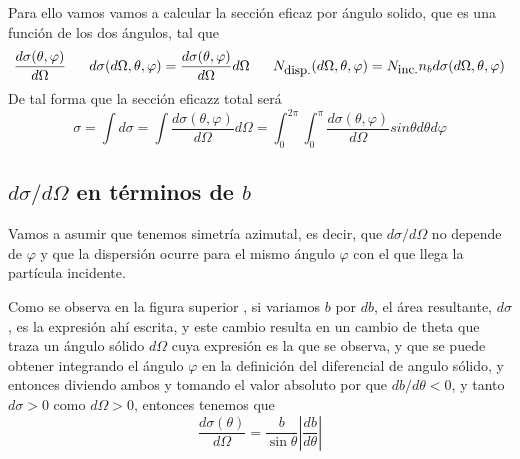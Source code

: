 Para ello vamos vamos a calcular la sección eficaz por ángulo solido, que es una función de los dos ángulos, tal que
\begin{equation} \label{6.1.1}
    \frac{d\sigma(\theta,\varphi)}{d\Omega}\ \ \ \ \ d\sigma(d\Omega, \theta,\varphi) = \frac{d\sigma(\theta,\varphi)}{d\Omega} d\Omega \ \ \ \ \ N_{\mbox{\small disp.}}(d\Omega, \theta,\varphi) = N_{\mbox{\small inc.}} n_b d\sigma(d\Omega, \theta,\varphi)
\end{equation} 
De tal forma que la sección eficazz total será 
\begin{equation} \label{6.1.1}
    \sigma = \int d\sigma = \int \frac{d\sigma(\theta,\varphi)}{d\Omega} d\Omega = \int_0^{2\pi}\int_0^\pi \frac{d\sigma(\theta,\varphi)}{d\Omega} sin\theta d\theta d\varphi
\end{equation} 
\subsection{$d\sigma/d\Omega$ en términos de $b$}
Vamos a asumir que tenemos simetría azimutal, es decir, que $d\sigma/d\Omega$ no depende de $\varphi$ y que la dispersión ocurre para el mismo ángulo $\varphi$ con el que llega la partícula incidente.
\vspace{-15pt}
\begin{figure}[H]
    \def\svgwidth{8 cm}
    \normalsize
	
\end{figure}
\vspace{-15pt}
Como se observa en la figura superior , si variamos $b$ por $db$, el área resultante, $d\sigma$, es la expresión ahí escrita, y este cambio resulta en un cambio de theta que traza un ángulo sólido $d\Omega$ cuya expresión es la que se observa, y que se puede obtener integrando el ángulo $\varphi$ en la definición del diferencial de angulo sólido, y entonces diviendo ambos y tomando el valor absoluto por que $db/d\theta <0$, y tanto $d\sigma>0$ como $d\Omega>0$, entonces tenemos que 
\begin{equation} \label{6.1.1}
    \frac{d\sigma(\theta)}{d\Omega} = \frac{b}{\sin\theta}\left|\frac{db}{d\theta}\right|
\end{equation} 